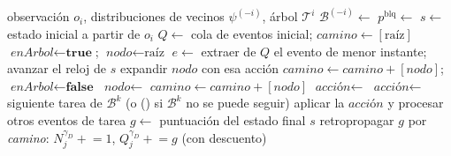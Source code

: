 \begin{algorithm}[t]
\caption{\textsc{Iteración} de Dec-MCTS --- una simulación con cola de eventos}
\label{alg:decmcts-sim}
\begin{algorithmic}[1]
\Require observación $o_i$, distribuciones de vecinos $\psi^{(-i)}$, árbol $\mathcal{T}^{i}$
\State $\mathcal{B}^{(-i)} \gets$  
\State $p^{\mathrm{blq}} \gets$  
\State $s \gets$ estado inicial a partir de $o_i$
\State $Q \gets$ cola de eventos inicial; \quad $\textit{camino} \gets [\text{raíz}]$
\State $\textit{enArbol} \gets \textbf{true}$; \quad $\textit{nodo} \gets \text{raíz}$
    \State $e \gets$ extraer de $Q$ el evento de menor instante; avanzar el reloj de $s$
            \State expandir $\textit{nodo}$ con esa acción
            \State $\textit{camino} \gets \textit{camino} + [\textit{nodo}]$; \quad $\textit{enArbol} \gets \textbf{false}$
            \State $\textit{nodo} \gets$  
            \State $\textit{camino} \gets \textit{camino} + [\textit{nodo}]$
        \Else
            \State $\textit{acción} \gets$  
        \EndIf
        \State $\textit{acción} \gets$ siguiente tarea de $\mathcal{B}^{k}$ (o () si $\mathcal{B}^{k}$ no se puede seguir)
    \EndIf
    \State aplicar la $\textit{acción}$ y procesar otros eventos de tarea
\EndWhile
\State $g \gets$ puntuación del estado final $s$ 
\State retropropagar $g$ por \textit{camino}: $N_j^{\gamma_D}\!\mathrel{+}=\!1$, $Q_j^{\gamma_D}\!\mathrel{+}=\!g$ (con descuento)
\end{algorithmic}
\end{algorithm}

